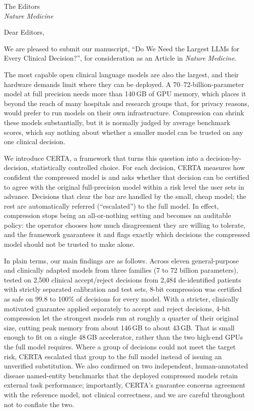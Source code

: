 \documentclass[11pt]{letter}
\begin{document}
\begin{letter}{The Editors\\
\textit{Nature Medicine}}

\opening{Dear Editors,}

We are pleased to submit our manuscript, ``Do We Need the Largest LLMs for Every Clinical Decision?'', for consideration as an Article in \textit{Nature Medicine}.

The most capable open clinical language models are also the largest, and their hardware demands limit where they can be deployed. A 70--72-billion-parameter model at full precision needs more than 140\,GB of GPU memory, which places it beyond the reach of many hospitals and research groups that, for privacy reasons, would prefer to run models on their own infrastructure. Compression can shrink these models substantially, but it is normally judged by average benchmark scores, which say nothing about whether a smaller model can be trusted on any one clinical decision.

We introduce CERTA, a framework that turns this question into a decision-by-decision, statistically controlled choice. For each decision, CERTA measures how confident the compressed model is and asks whether that decision can be certified to agree with the original full-precision model within a risk level the user sets in advance. Decisions that clear the bar are handled by the small, cheap model; the rest are automatically referred (``escalated'') to the full model. In effect, compression stops being an all-or-nothing setting and becomes an auditable policy: the operator chooses how much disagreement they are willing to tolerate, and the framework guarantees it and flags exactly which decisions the compressed model should not be trusted to make alone.

In plain terms, our main findings are as follows. Across eleven general-purpose and clinically adapted models from three families (7 to 72 billion parameters), tested on 2,500 clinical accept/reject decisions from 2,484 de-identified patients with strictly separated calibration and test sets, 8-bit compression was certified as safe on 99.8 to 100\% of decisions for every model. With a stricter, clinically motivated guarantee applied separately to accept and reject decisions, 4-bit compression let the strongest models run at roughly a quarter of their original size, cutting peak memory from about 146\,GB to about 43\,GB. That is small enough to fit on a single 48\,GB accelerator, rather than the two high-end GPUs the full model requires. Where a group of decisions could not meet the target risk, CERTA escalated that group to the full model instead of issuing an unverified substitution. We also confirmed on two independent, human-annotated disease named-entity benchmarks that the deployed compressed models retain external task performance; importantly, CERTA's guarantee concerns agreement with the reference model, not clinical correctness, and we are careful throughout not to conflate the two.


\end{letter}
\end{document}
